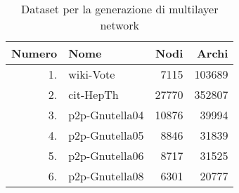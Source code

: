 \begin{table}
    \caption{Dataset per la generazione di multilayer network}
    \label{tab:multilayer}
    \centering
    \begin{tabular}{rlrr}
        \toprule
            Numero & Nome & Nodi & Archi \\
        \midrule
        1. & wiki-Vote & \num{7115} & \num{103689} \\
        2. & cit-HepTh & \num{27770} & \num{352807} \\
        3. & p2p-Gnutella04 & \num{10876} &  \num{39994} \\ 
        4. & p2p-Gnutella05  & \num{8846} & \num{31839} \\ 
        5. & p2p-Gnutella06  & \num{8717} & \num{31525} \\ 
        6. & p2p-Gnutella08 & \num{6301} & \num{20777} \\
        \bottomrule
    \end{tabular}
%         
\end{table}